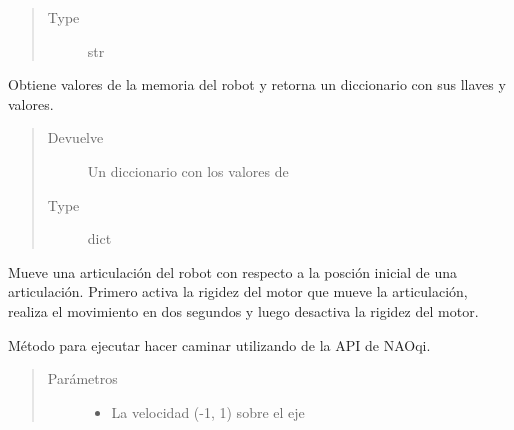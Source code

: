 \begin{fulllineitems}
\begin{fulllineitems}
\begin{quote}
\begin{description}
\item[{Type}] \leavevmode
str

\end{description}\end{quote}

\end{fulllineitems}


\begin{fulllineitems}
\label{\detokenize{nao_firebase:nao_robot.Robot.get_values_from_memory}}
Obtiene valores de la memoria del robot y retorna un diccionario
con sus llaves y valores.
\begin{quote}\begin{description}
\item[{Devuelve}] \leavevmode
Un diccionario con los valores de 

\item[{Type}] \leavevmode
dict

\end{description}\end{quote}

\end{fulllineitems}


\begin{fulllineitems}
\label{\detokenize{nao_firebase:nao_robot.Robot.move_joint}}
Mueve una articulación del robot con respecto a la posción inicial de una
articulación. Primero activa la rigidez del motor que mueve la articulación, realiza el movimiento en dos
segundos y luego desactiva la rigidez del motor.

\end{fulllineitems}


\begin{fulllineitems}
\label{\detokenize{nao_firebase:nao_robot.Robot.move_robot}}
Método para ejecutar hacer caminar utilizando  de la
API de NAOqi.
\begin{quote}\begin{description}
\item[{Parámetros}] \leavevmode\begin{itemize}
\item {} 
 \textendash{} La velocidad (-1, 1) sobre el eje 


\end{itemize}
\end{description}
\end{quote}
\end{fulllineitems}
\end{fulllineitems}
